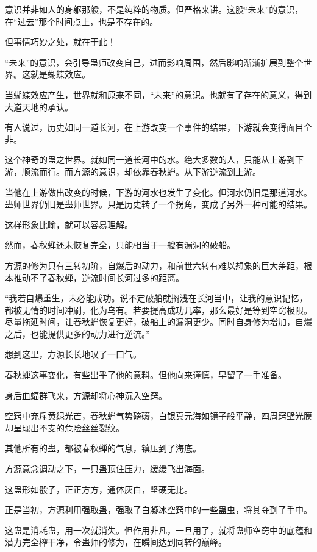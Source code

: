 \begin{this_body}
意识并非如人的身躯那般，不是纯粹的物质。但严格来讲。这股“未来”的意识，在“过去”那个时间点上，也是不存在的。

但事情巧妙之处，就在于此！

“未来”的意识，会引导蛊师改变自己，进而影响周围，然后影响渐渐扩展到整个世界。这就是蝴蝶效应。

当蝴蝶效应产生，世界就和原来不同，“未来”的意识。也就有了存在的意义，得到大道天地的承认。

有人说过，历史如同一道长河，在上游改变一个事件的结果，下游就会变得面目全非。

这个神奇的蛊之世界。就如同一道长河中的水。绝大多数的人，只能从上游到下游，顺流而行。而方源的意识，却依靠春秋蝉。从下游逆流到上游。

当他在上游做出改变的时候，下游的河水也发生了变化。但河水仍旧是那道河水。蛊师世界仍旧是蛊师世界。只是历史转了一个拐角，变成了另外一种可能的结果。

这样形象比喻，就可以容易理解。

然而，春秋蝉还未恢复完全，只能相当于一艘有漏洞的破船。

方源的修为只有三转初阶，自爆后的动力，和前世六转有难以想象的巨大差距，根本推动不了春秋蝉，逆流时间长河过多的距离。

“我若自爆重生，未必能成功。说不定破船就搁浅在长河当中，让我的意识记忆，都被无情的时间冲刷，化为乌有。若要提高成功几率，那么最好是等到空窍极限。尽量拖延时间，让春秋蝉恢复更好，破船上的漏洞更少。同时自身修为增加，自爆之后，也能提供更多的动力进行逆流。”

想到这里，方源长长地叹了一口气。

春秋蝉这事变化，有些出乎了他的意料。但他向来谨慎，早留了一手准备。

身后血蝠群飞来，方源却将心神沉入空窍。

空窍中充斥黄绿光芒，春秋蝉气势磅礴，白银真元海如镜子般平静，四周窍壁光膜却呈现出不支的危险丝丝裂纹。

其他所有的蛊，都被春秋蝉的气息，镇压到了海底。

方源意念调动之下，一只蛊顶住压力，缓缓飞出海面。

这蛊形如骰子，正正方方，通体灰白，坚硬无比。

正是当初，方源利用强取蛊，强取了白凝冰空窍中的一些蛊虫，将其夺到了手中。

这蛊是消耗蛊，用一次就消失。但作用非凡，一旦用了，就将蛊师空窍中的底蕴和潜力完全榨干净，令蛊师的修为，在瞬间达到同转的巅峰。


\end{this_body}
